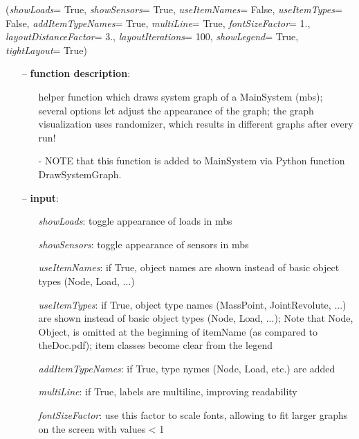 %
\begin{flushleft}
\label{sec:mainsystemextensions:DrawSystemGraph}
({\it showLoads}= True, {\it showSensors}= True, {\it useItemNames}= False, {\it useItemTypes}= False, {\it addItemTypeNames}= True, {\it multiLine}= True, {\it fontSizeFactor}= 1., {\it layoutDistanceFactor}= 3., {\it layoutIterations}= 100, {\it showLegend}= True, {\it tightLayout}= True)
\end{flushleft}
\setlength{\itemindent}{0.7cm}
\begin{itemize}[leftmargin=0.7cm]
\item[--]
{\bf function description}: \vspace{-6pt}
\begin{itemize}[leftmargin=1.2cm]
\setlength{\itemindent}{-0.7cm}
\item[]helper function which draws system graph of a MainSystem (mbs); several options let adjust the appearance of the graph; the graph visualization uses randomizer, which results in different graphs after every run!
\item[]- NOTE that this function is added to MainSystem via Python function DrawSystemGraph.
\end{itemize}
\item[--]
{\bf input}: \vspace{-6pt}
\begin{itemize}[leftmargin=1.2cm]
\setlength{\itemindent}{-0.7cm}
\item[]{\it showLoads}: toggle appearance of loads in mbs
\item[]{\it showSensors}: toggle appearance of sensors in mbs
\item[]{\it useItemNames}: if True, object names are shown instead of basic object types (Node, Load, ...)
\item[]{\it useItemTypes}: if True, object type names (MassPoint, JointRevolute, ...) are shown instead of basic object types (Node, Load, ...); Note that Node, Object, is omitted at the beginning of itemName (as compared to theDoc.pdf); item classes become clear from the legend
\item[]{\it addItemTypeNames}: if True, type nymes (Node, Load, etc.) are added
\item[]{\it multiLine}: if True, labels are multiline, improving readability
\item[]{\it fontSizeFactor}: use this factor to scale fonts, allowing to fit larger graphs on the screen with values < 1

\end{itemize}
\end{itemize}

